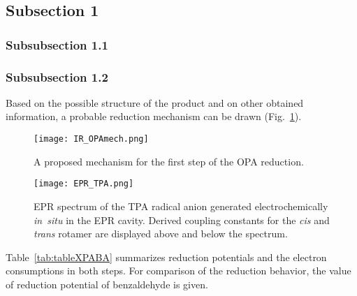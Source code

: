 \lipsum[1]

\subsection{Subsection 1}
\label{sec:subsection_res_1}

\lipsum[2]

\subsubsection{Subsubsection 1.1}
\label{sec:subsubsec_res_1.1}

\lipsum[3]

\subsubsection{Subsubsection 1.2}
\label{sec:subsubsec_res_1.2}

\lipsum[4]


Based on the possible structure of the product and on other obtained information, a probable reduction mechanism can be drawn (Fig.~\ref{fig:IR_OPAmech}). 

\begin{figure}[!ht]
  \centering
 \texttt{[image: IR\_OPAmech.png]}
 \caption{A proposed mechanism for the first step of the OPA reduction.}
 \label{fig:IR_OPAmech}
\end{figure}


\begin{landscape}
\begin{figure}[!ht]
  \centering
 \texttt{[image: EPR\_TPA.png]}
 \caption[EPR spectrum of the TPA radical anion.]{EPR spectrum of the TPA radical anion generated electrochemically \textit{in~situ} in the EPR cavity. Derived coupling constants for the \textit{cis} and \textit{trans} rotamer are displayed above and below the spectrum.}
 \label{fig:EPR_TPA}
\end{figure}

\end{landscape}


Table~\ref{tab:tableXPABA} summarizes reduction potentials and the electron consumptions in both steps. For comparison of the reduction behavior, the value of reduction potential of benzaldehyde is given.

